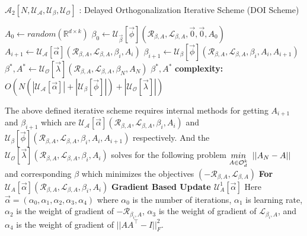 \begin{algorithm}[H]
\caption{$\mathcal{A}_{2}[N,\mathcal{U_{A}},\mathcal{U_{\beta}}, \mathcal{U_{O}}]$ : Delayed Orthogonalization Iterative Scheme (DOI Scheme)}\label{lfm_orthogonal_property_iterative_scheme}
\begin{algorithmic}[1]
\State $A_{0} \gets random(\mathbb{R}^{d\times k}) $
\State $\beta_0 \gets \mathcal{U_{\vec{\beta}}}[\vec{\phi}](\mathcal{R}_{\beta, A},\mathcal{L}_{\beta, A},\Vec{0},\Vec{0},A_{0})$
    \State $A_{i+1} \gets  \mathcal{U_{A}}[\vec{\alpha}](\mathcal{R}_{\beta, A},\mathcal{L}_{\beta, A},\beta_i,A_i)$
    \State $\beta_{i+1} \gets \mathcal{U_{\beta}}[\vec{\phi}](\mathcal{R}_{\beta, A},\mathcal{L}_{\beta, A},\beta_{i}, A_{i}, A_{i+1})$
\EndFor
\State $\beta^{*}, A^{*} \gets \mathcal{U_{O}}[\vec{\lambda}](\mathcal{R}_{\beta, A},\mathcal{L}_{\beta, A},\beta_{N}, A_{N})$
\State \Return $\beta^{*},A^{*}$
\State \textbf{complexity: } $O(N(|\mathcal{U_{A}}[\vec{\alpha}]|+|\mathcal{U_{\beta}}[\vec{\phi}]|)+|\mathcal{U_{O}}[\vec{\lambda}]|)$
\end{algorithmic}
\end{algorithm} \hspace{0mm} \newline The above defined iterative scheme requires internal methods for getting $A_{i+1}$ and $\beta_{i+1}$ which are $\mathcal{U_{A}}[\vec{\alpha}](\mathcal{R}_{\beta, A},\mathcal{L}_{\beta, A},\beta_i,A_i)$ and $\mathcal{U_{\beta}}[\vec{\phi}](\mathcal{R}_{\beta, A},\mathcal{L}_{\beta, A},\beta_i, A_{i}, A_{i+1})$ respectively. And the $\mathcal{U_{O}}[\vec{\lambda}](\mathcal{R}_{\beta, A},\mathcal{L}_{\beta, A},\beta_i,A_i)$ solves for the following problem $\underset{A \in \mathcal{O}_d^k}{min} \hspace{2mm} ||A_{N}-A||$ and corresponding $\beta$ which minimizes the objectives $(-\mathcal{R}_{\beta, A},\mathcal{L}_{\beta, A})$ 
\newline \newline \textbf{ For $\mathcal{U}_{A}[\vec{\alpha}](\mathcal{R}_{\beta, A},\mathcal{L}_{\beta, A},\beta_i,A_i)$}
\newline \textbf{Gradient Based Update $\mathcal{U}^{1}_{A}[\vec{\alpha}]$}
\newline Here $\vec{\alpha} = (\alpha_0,\alpha_1,\alpha_2,\alpha_3,\alpha_4)$ where $\alpha_0$ is the number of iterations, $\alpha_1$ is learning rate, $\alpha_2$ is the weight of gradient of $-\mathcal{R}_{\beta_i, A}$,  $\alpha_3$ is the weight of gradient of $\mathcal{L}_{\beta_i, A}$, and  $\alpha_4$ is the weight of gradient of $||AA^\top-I||^2_F$.
